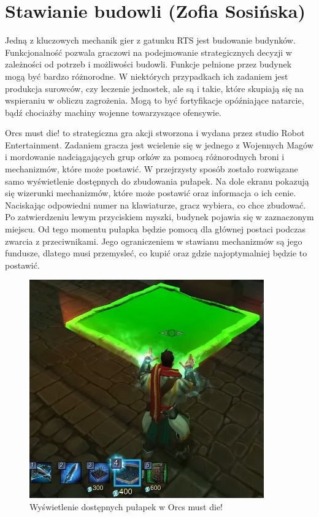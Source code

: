 \section{Stawianie budowli (Zofia Sosińska)}\label{chap:omd}
Jedną z kluczowych mechanik gier z gatunku RTS jest budowanie budynków. Funkcjonalność pozwala graczowi 
na podejmowanie strategicznych decyzji w zależności od potrzeb i możliwości budowli. Funkcje pełnione 
przez budynek mogą być bardzo różnorodne. W niektórych przypadkach ich zadaniem jest produkcja surowców, czy leczenie
jednostek, ale są i takie, które skupiają się na wspieraniu w obliczu zagrożenia. Mogą to być fortyfikacje opóźniające natarcie,
bądź chociażby machiny wojenne towarzyszące ofensywie.

Orcs must die! to strategiczna gra akcji stworzona i wydana przez studio Robot Entertainment. Zadaniem gracza jest wcielenie się
w jednego z  Wojennych Magów i mordowanie nadciągających grup orków za pomocą różnorodnych broni i mechanizmów, które może postawić.
W przejrzysty sposób zostało rozwiązane samo wyświetlenie dostępnych do zbudowania pułapek. Na dole ekranu pokazują się wizerunki mechanizmów,
które może postawić oraz informacja o ich cenie. Naciskając odpowiedni numer na klawiaturze, gracz wybiera, co chce zbudować. Po zatwierdzeniu lewym przyciskiem myszki,
budynek pojawia się w zaznaczonym miejscu. Od tego momentu pułapka będzie pomocą dla głównej postaci podczas zwarcia z przeciwnikami.
Jego ograniczeniem w stawianu mechanizmów są jego fundusze, dlatego musi przemysleć, co kupić oraz gdzie najoptymalniej będzie to postawić.

\begin{figure}[h!tbp]
    \centering
    \includegraphics[width=0.9\textwidth]{images/ui/buoildingsOrcs.png}
    \caption{Wyświetlenie dostępnych pułapek w Orcs must die!}\label{fig:Orcs}
\end{figure}
